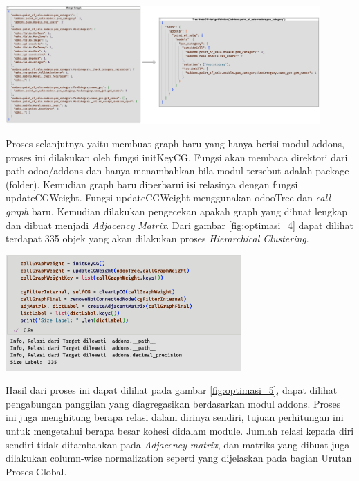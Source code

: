 \begin{center}
	\includegraphics[width=12cm]{img/bab_4/optimisasi_3.png}
	\label{fig:optimasi_3}
\end{center}

Proses selanjutnya yaitu membuat graph baru yang hanya berisi modul addons, proses ini dilakukan oleh fungsi initKeyCG. Fungsi akan membaca direktori dari path odoo/addons dan hanya menambahkan bila modul tersebut adalah package (folder). Kemudian graph baru diperbarui isi relasinya dengan fungsi updateCGWeight. Fungsi updateCGWeight menggunakan odooTree dan \textit{call graph} baru. Kemudian dilakukan pengecekan apakah graph yang dibuat lengkap dan dibuat menjadi \textit{Adjacency} \textit{Matrix}.  Dari gambar \ref{fig:optimasi_4} dapat dilihat terdapat 335 objek yang akan dilakukan proses \textit{Hierarchical Clustering}.

\begin{center}
	\includegraphics[width=9cm]{img/bab_4/optimisasi_4.png}
	\label{fig:optimasi_4}
\end{center}

Hasil dari proses ini dapat dilihat pada gambar \ref{fig:optimasi_5}, dapat dilihat pengabungan panggilan yang diagregasikan berdasarkan modul addons. Proses ini juga menghitung berapa relasi dalam dirinya sendiri, tujuan perhitungan ini untuk mengetahui berapa besar kohesi didalam module. Jumlah relasi kepada diri sendiri tidak ditambahkan pada \textit{Adjacency} \textit{matrix}, dan matriks yang dibuat juga dilakukan column-wise normalization seperti yang dijelaskan pada bagian Urutan Proses Global.  

